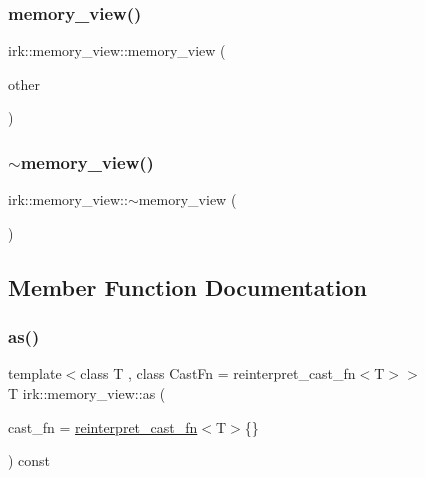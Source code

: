 \mbox{\label{classirk_1_1memory__view_ac057f2cd40190acb964acd24e1fdeac1}} 
\subsubsection{\texorpdfstring{memory\+\_\+view()}{memory\_view()}\hspace{0.1cm}{\footnotesize\ttfamily [4/4]}}
{\footnotesize\ttfamily irk\+::memory\+\_\+view\+::memory\+\_\+view (\begin{DoxyParamCaption}\item[{\mbox{\hyperlink{classirk_1_1memory__view}{memory\+\_\+view}} \&\&}]{other }\end{DoxyParamCaption})\hspace{0.3cm}{\ttfamily [default]}}

\mbox{\label{classirk_1_1memory__view_a06b0a6d7117a0edd95323c423ef5c34c}} 
\subsubsection{\texorpdfstring{$\sim$memory\+\_\+view()}{~memory\_view()}}
{\footnotesize\ttfamily irk\+::memory\+\_\+view\+::$\sim$memory\+\_\+view (\begin{DoxyParamCaption}{ }\end{DoxyParamCaption})\hspace{0.3cm}{\ttfamily [default]}}



\subsection{Member Function Documentation}
\mbox{\label{classirk_1_1memory__view_ae9d042dabe259ef35ac2fec319c40b57}} 
\subsubsection{\texorpdfstring{as()}{as()}}
{\footnotesize\ttfamily template$<$class T , class Cast\+Fn  = reinterpret\+\_\+cast\+\_\+fn$<$\+T$>$$>$ \\
T irk\+::memory\+\_\+view\+::as (\begin{DoxyParamCaption}\item[{Cast\+Fn}]{cast\+\_\+fn = {\ttfamily \mbox{\hyperlink{structirk_1_1reinterpret__cast__fn}{reinterpret\+\_\+cast\+\_\+fn}}$<$T$>$\{\}} }\end{DoxyParamCaption}) const\hspace{0.3cm}{\ttfamily [inline]}}

